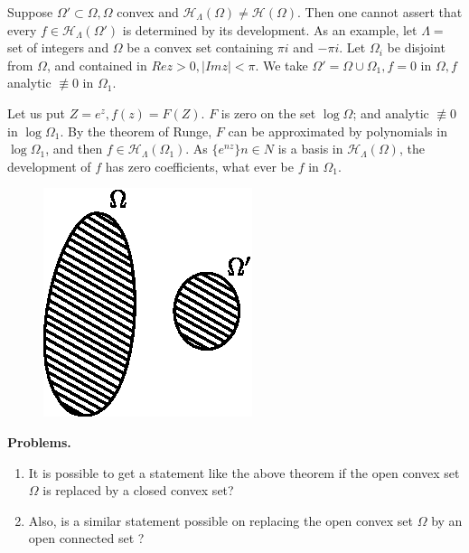 \begin{remark*}%
 Suppose $\Omega' \subset \Omega, \Omega$ convex and
 $\mathscr{H}_\Lambda (\Omega) \neq \mathscr{H} (\Omega)$. Then one
 cannot assert that every $f \in \mathscr{H}_\Lambda (\Omega')$ is
 determined by its development. As an example, let $\Lambda=$ set of
 integers and $\Omega$ be a convex set containing $\pi i $ and $- \pi
 i$. Let $\Omega_i$ be disjoint from $\Omega$, and contained in $Rez
 > 0, \big| Imz \big| < \pi$. We take $\Omega' = \Omega \cup
 \Omega_1, f = 0$ in $\Omega, f$ analytic $\nequiv 0$ in
 $\Omega_1$.
\medskip

\noindent 
\begin{minipage}[c]{5.8cm} 
 Let us put $Z = e^z, f(z) = F(Z)$. $F$ is zero on the
 set $\log \Omega$; and analytic $\nequiv 0$ in $\log \Omega_1$. By
 the theorem of Runge, $F$ can be approximated by polynomials in
 $\log \Omega_1$, and then $f \in \mathscr{H}_\Lambda (\Omega_1)$. As
 $\{e^{nz}\} n \in N$ is a basis in $\mathscr{H}_\Lambda (\Omega)$,
 the development of $f$ has zero coefficients, what ever be $f$ in
 $\Omega_1$. 
\end{minipage}
\begin{minipage}[c]{5cm}
\begin{figure}[H]
\centerline{\includegraphics{vol15-figures/fig15-2.eps}}
\end{figure}
\end{minipage}
\end{remark*}

\noindent \textbf{Problems. }
 \begin{enumerate}[1)]
 \item It is possible to get a statement like the above theorem if
 the open convex set $\Omega$ is replaced by a closed convex set? 
 \item Also, is a similar statement possible on replacing the open
 convex set $\Omega$ by an open connected set ? 
 \end{enumerate}
